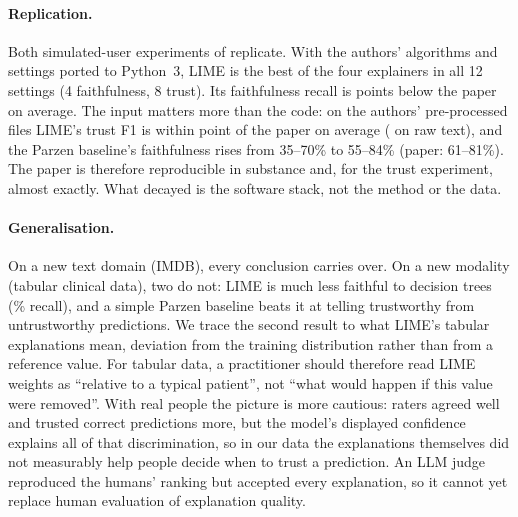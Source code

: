 \paragraph{Replication.} Both simulated-user experiments of \citet{ribeiro2016} replicate. With the authors' algorithms and settings ported to Python~3, LIME is the best of the four explainers in all 12 settings (4 faithfulness, 8 trust). Its faithfulness recall is \ReplRecallGap{} points below the paper on average. The input matters more than the code: on the authors' pre-processed files LIME's trust F1 is within \ReplTrustMAE{} point of the paper on average (\MAERawTrustLime{} on raw text), and the Parzen baseline's faithfulness rises from 35--70\% to 55--84\% (paper: 61--81\%). The paper is therefore reproducible in substance and, for the trust experiment, almost exactly. What decayed is the software stack, not the method or the data.

\paragraph{Generalisation.} On a new text domain (IMDB), every conclusion carries over. On a new modality (tabular clinical data), two do not: LIME is much less faithful to decision trees (\HeartTreeRecall{}\% recall), and a simple Parzen baseline beats it at telling trustworthy from untrustworthy predictions. We trace the second result to what LIME's tabular explanations mean, deviation from the training distribution rather than from a reference value. For tabular data, a practitioner should therefore read LIME weights as ``relative to a typical patient'', not ``what would happen if this value were removed''. With real people the picture is more cautious: raters agreed well and trusted correct predictions more, but the model's displayed confidence explains all of that discrimination, so in our data the explanations themselves did not measurably help people decide when to trust a prediction. An LLM judge reproduced the humans' ranking but accepted every explanation, so it cannot yet replace human evaluation of explanation quality.

